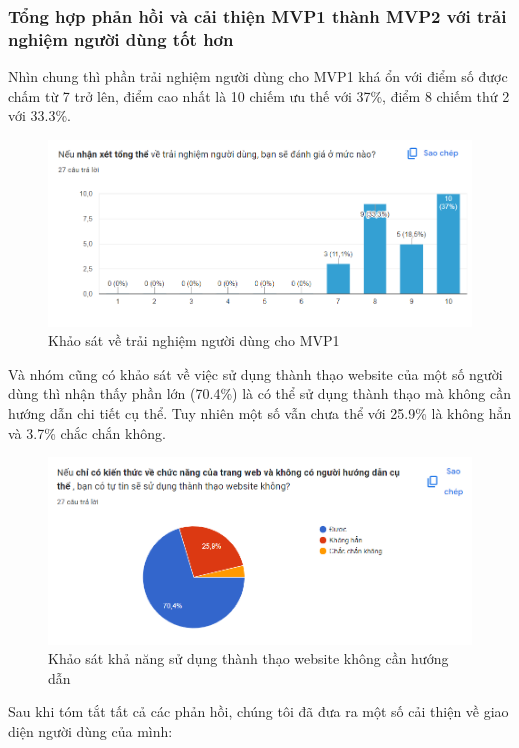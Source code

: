 \subsubsection{Tổng hợp phản hồi và cải thiện MVP1 thành MVP2 với trải nghiệm người dùng tốt hơn}
Nhìn chung thì phần trải nghiệm người dùng cho MVP1 khá ổn với điểm số được chấm từ 7 trở lên, điểm cao nhất là 10 chiếm ưu thế với 37\%, điểm 8 chiếm thứ 2 với 33.3\%.
\begin{figure}[H]
    \begin{center}
        \includegraphics[width=1\textwidth]{Images/Test/test_total.png}
        \caption{Khảo sát về trải nghiệm người dùng cho MVP1}
    \end{center}
\end{figure}
Và nhóm cũng có khảo sát về việc sử dụng thành thạo website của một số người dùng thì nhận thấy phần lớn (70.4\%) là có thể sử dụng thành thạo mà không cần hướng dẫn chi tiết cụ thể. Tuy nhiên một số vẫn chưa thể với 25.9\% là không hẳn và 3.7\% chắc chắn không.
\begin{figure}[H]
    \begin{center}
        \includegraphics[width=1\textwidth]{Images/Test/test_tutoral.png}
        \caption{Khảo sát khả năng sử dụng thành thạo website không cần hướng dẫn}
    \end{center}
\end{figure}
Sau khi tóm tắt tất cả các phản hồi, chúng tôi đã đưa ra một số cải thiện về giao diện người dùng của mình:
